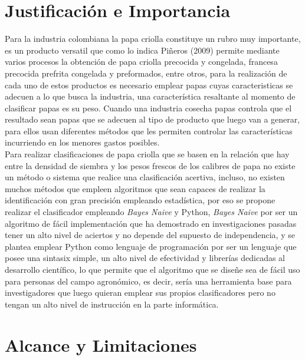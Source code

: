 \section{Justificaci\'on e Importancia}

Para la industria colombiana la papa criolla constituye un rubro muy importante, es un producto versatil que como lo indica Piñeros (2009) permite mediante varios procesos la obtención de papa criolla precocida y congelada, francesa precocida prefrita congelada y preformados, entre otros, para la realización de cada uno de estos productos es necesario emplear papas cuyas caracteristicas se adecuen a lo que busca la industria, una característica resaltante al momento de clasificar papas es su peso. Cuando una industria cosecha papas controla que el resultado sean papas que se adecuen al tipo de producto que luego van a generar, para ellos usan diferentes métodos que les permiten controlar las características incurriendo en los menores gastos posibles.\\

Para realizar clasificaciones de papa criolla que se basen en la relación que hay entre la densidad de siembra y los pesos frescos de los calibres de papa no existe un método o sistema que realice una clasificación acertiva, incluso, no existen muchos métodos que empleen algoritmos que sean capaces de realizar la identificación con gran precisión empleando estadística, por eso se propone realizar el clasificador empleando \textit{Bayes Naive} y Python, \textit{Bayes Naive} por ser un algoritmo de fácil implementación que ha demostrado en investigaciones pasadas tener un alto nivel de aciertos y no depende del supuesto de independencia, y se plantea emplear Python como lenguaje de programación por ser un lenguaje que posee una sintasix simple, un alto nivel de efectividad y librerías dedicadas al desarrollo científico, lo que permite que el algoritmo que se diseñe sea de fácil uso para personas del campo agronómico, es decir, sería una herramienta base para investigadores que luego quieran emplear sus propios clasificadores pero no tengan un alto nivel de instrucción en la parte informática. 
	
\section{Alcance y Limitaciones}

